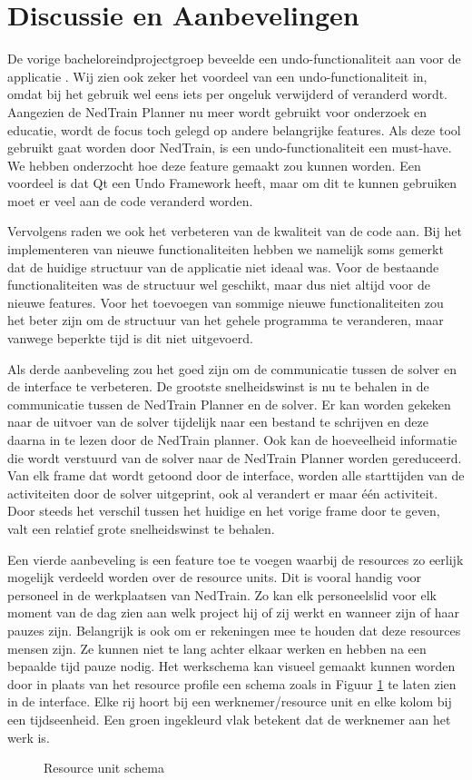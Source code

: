 \section{Discussie en Aanbevelingen}
De vorige bacheloreindprojectgroep beveelde een undo-functionaliteit aan voor de applicatie \cite{bep2012nedtrain}. Wij zien ook zeker het voordeel van een undo-functionaliteit in, omdat bij het gebruik wel eens iets per ongeluk verwijderd of veranderd wordt. Aangezien de NedTrain Planner nu meer wordt gebruikt voor onderzoek en educatie, wordt de focus toch gelegd op andere belangrijke features. Als deze tool gebruikt gaat worden door NedTrain, is een undo-functionaliteit een must-have. We hebben onderzocht hoe deze feature gemaakt zou kunnen worden. Een voordeel is dat Qt een Undo Framework heeft, maar om dit te kunnen gebruiken moet er veel aan de code veranderd worden. 

Vervolgens raden we ook het verbeteren van de kwaliteit van de code aan. Bij het implementeren van nieuwe functionaliteiten hebben we namelijk soms gemerkt dat de huidige structuur van de applicatie niet ideaal was. Voor de bestaande functionaliteiten was de structuur wel geschikt, maar dus niet altijd voor de nieuwe features. Voor het toevoegen van sommige nieuwe functionaliteiten zou het beter zijn om de structuur van het gehele programma te veranderen, maar vanwege beperkte tijd is dit niet uitgevoerd.

Als derde aanbeveling zou het goed zijn om de communicatie tussen de solver en de interface te verbeteren. De grootste snelheidswinst is nu te behalen in de communicatie tussen de NedTrain Planner en de solver. Er kan worden gekeken naar de uitvoer van de solver tijdelijk naar een bestand te schrijven en deze daarna in te lezen door de NedTrain planner. Ook kan de hoeveelheid informatie die wordt verstuurd van de solver naar de NedTrain Planner worden gereduceerd. Van elk frame dat wordt getoond door de interface, worden alle starttijden van de activiteiten door de solver uitgeprint, ook al verandert er maar \'e\'en activiteit. Door steeds het verschil tussen het huidige en het vorige frame door te geven, valt een relatief grote snelheidswinst te behalen.

Een vierde aanbeveling is een feature toe te voegen waarbij de resources zo eerlijk mogelijk verdeeld worden over de resource units. Dit is vooral handig voor personeel in de werkplaatsen van NedTrain. Zo kan elk personeelslid voor elk moment van de dag zien aan welk project hij of zij werkt en wanneer zijn of haar pauzes zijn. Belangrijk is ook om er rekeningen mee te houden dat deze resources mensen zijn. Ze kunnen niet te lang achter elkaar werken en hebben na een bepaalde tijd pauze nodig. Het werkschema kan visueel gemaakt kunnen worden door in plaats van het resource profile een schema zoals in Figuur \ref{fig:schema} te laten zien in de interface. Elke rij hoort bij een werknemer/resource unit en elke kolom bij een tijdseenheid. Een groen ingekleurd vlak betekent dat de werknemer aan het werk is.

\begin{figure}[H]
\centering

\caption{Resource unit schema}
\label{fig:schema}
\end{figure}
